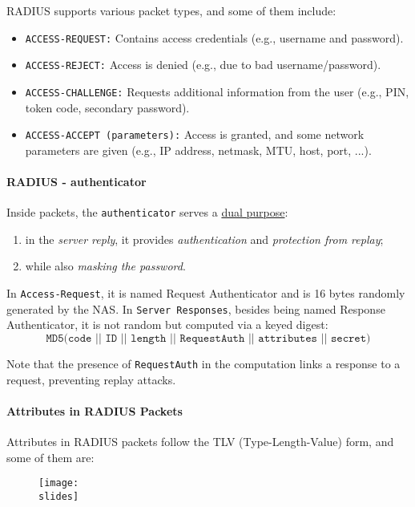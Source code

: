 \vspace*{7mm}    
RADIUS supports various packet types, and some of them include:

\begin{itemize}
    \item \texttt{ACCESS-REQUEST:} Contains access credentials (e.g., username and password).
    \item \texttt{ACCESS-REJECT:} Access is denied (e.g., due to bad username/password).
    \item \texttt{ACCESS-CHALLENGE:} Requests additional information from the user (e.g., PIN, token code, secondary password).
    \item \texttt{ACCESS-ACCEPT (parameters):} Access is granted, and some network parameters are given (e.g., IP address, netmask, MTU, host, port, ...).
\end{itemize}


\paragraph*{RADIUS - authenticator}
Inside packets, the \texttt{authenticator} serves a \underline{dual purpose}: 
\begin{enumerate}
    \item in the \textit{server reply}, it provides \textit{authentication} and \textit{protection from replay};
    \item while also \textit{masking the password}.
\end{enumerate}

In \texttt{Access-Request}, it is named Request Authenticator and is 16 bytes randomly generated by the NAS. In \texttt{Server Responses}, besides being named Response Authenticator, it is not random but computed via a keyed digest:
\[
\texttt{MD5(code || ID || length || RequestAuth || attributes || secret)} 
\]

Note that the presence of \texttt{RequestAuth} in the computation links a response to a request, preventing replay attacks.



\paragraph{Attributes in RADIUS Packets}
Attributes in RADIUS packets follow the TLV (Type-Length-Value) form, and some of them are:

\begin{figure}[H]
    \centering
    \texttt{[image: \\slides]}
\end{figure}

